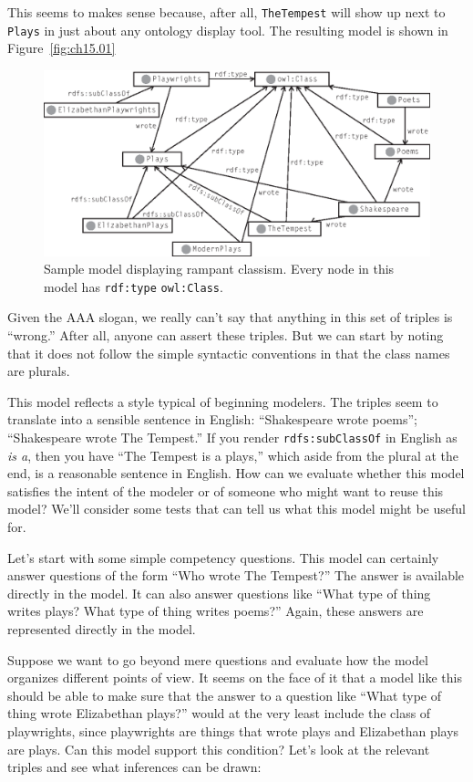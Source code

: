 This seems to makes sense because, after all, \texttt{TheTempest} will show up
next to \texttt{Plays} in just about any ontology display tool. The resulting
model is shown in Figure~\ref{fig:ch15.01}


\begin{figure}
\centering
\includegraphics[width=5in]{media/ch15/f15-01.eps}
\caption{Sample model displaying rampant classism. Every node in this model has
\texttt{rdf:type} \texttt{owl:Class}.
}
\label{fig:ch14.01}
\end{figure}


Given the AAA slogan, we really can't say that anything in this set of
triples is ``wrong.'' After all, anyone can assert these triples. But we
can start by noting that it does not follow the simple syntactic
conventions in that the class names are plurals.

This model reflects a style typical of beginning modelers. The triples
seem to translate into a sensible sentence in English: ``Shakespeare
wrote poems''; ``Shakespeare wrote The Tempest.'' If you render
\texttt{rdfs:subClassOf} in English as \emph{is a}, then you have ``The Tempest is a
plays,'' which aside from the plural at the end, is a reasonable
sentence in English. How can we evaluate whether this model satisfies
the intent of the modeler or of someone who might want to reuse this
model? We'll consider some tests that can tell us what this model might
be useful for.

Let's start with some simple competency questions. This model can
certainly answer questions of the form ``Who wrote The Tempest?'' The
answer is available directly in the model. It can also answer questions
like ``What type of thing writes plays? What type of thing writes
poems?'' Again, these answers are represented directly in the model.

Suppose we want to go beyond mere questions and evaluate how the model
organizes different points of view. It seems on the face of it that a
model like this should be able to make sure that the answer to a
question like ``What type of thing wrote Elizabethan plays?'' would at
the very least include the class of playwrights, since playwrights are
things that wrote plays and Elizabethan plays are plays. Can this model
support this condition? Let's look at the relevant triples and see what
inferences can be drawn:


